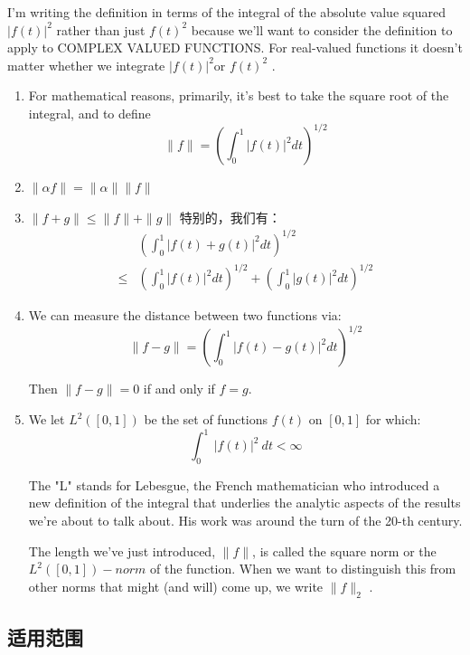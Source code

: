 I'm writing the deﬁnition in terms of the integral
of the absolute value squared $|f(t)| ^2$ rather than
just $f(t) ^2$ because we'll want to consider the
deﬁnition to apply to COMPLEX VALUED FUNCTIONS.
For real-valued functions it doesn't matter whether
we integrate $|f(t)|^2 $or $f(t) ^2$ .
\begin{enumerate}
	\item For mathematical reasons, primarily, it's best to take the square root of the integral, and to deﬁne
	      $$
		      \| f \| = \left( \int _ { 0 } ^ { 1 } | f ( t ) | ^ { 2 } d t \right) ^ { 1 / 2 }
	      $$
	\item $\| \alpha f \| = \| \alpha \| \| f \|$
	\item $\| f + g \| \leq \| f \| + \| g \|$
	      特别的，我们有：
	      \begin{align*}
		           & \left( \int _ { 0 } ^ { 1 } | f ( t ) + g ( t ) | ^ { 2 } d t \right) ^ { 1 / 2 }                                                                 \\
		      \leq & \left( \int _ { 0 } ^ { 1 } | f ( t ) | ^ { 2 } d t \right) ^ { 1 / 2 } + \left( \int _ { 0 } ^ { 1 } | g ( t ) | ^ { 2 } d t \right) ^ { 1 / 2 }
	      \end{align*}

	\item We can measure the distance between two functions via:
	      $$
		      \| f - g \| = \left( \int _ { 0 } ^ { 1 } | f ( t ) - g ( t ) | ^ { 2 } d t \right) ^ { 1 / 2 }
	      $$

	      Then $\|f-g\|=0$ if and only if $f = g$.
	\item We let $L^2 ([0, 1])$ be the set of functions $f(t)$ on $[0, 1]$ for which:
	      $$
		      \int_0^1\ |f(t)|^2\ dt<\infty
	      $$

	      The "L" stands for Lebesgue, the French mathematician who introduced a new deﬁnition of the integral that underlies the analytic aspects of the results we're about to talk about. His work was around the turn of the 20-th century.

	      The length we've just introduced, $\|f\|$,
	      is called the square norm or the $L^2 ([0, 1])-norm$ of the function.
	      When we want to distinguish this from other norms that might (and will) come up, we write $\|f\|_2$ .
\end{enumerate}

\subsection{适用范围}

